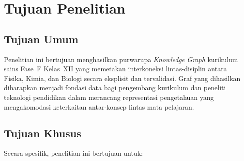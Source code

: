 \documentclass[main]{subfiles}
\begin{document}
\section{Tujuan Penelitian}

\subsection{Tujuan Umum}

Penelitian ini bertujuan menghasilkan purwarupa \textit{Knowledge Graph}
kurikulum sains Fase~F Kelas~XII yang memetakan interkoneksi lintas-disiplin
antara Fisika, Kimia, dan Biologi secara eksplisit dan tervalidasi. Graf yang
dihasilkan diharapkan menjadi fondasi data bagi pengembang kurikulum dan peneliti
teknologi pendidikan dalam merancang representasi pengetahuan yang mengakomodasi
keterkaitan antar-konsep lintas mata pelajaran.

\subsection{Tujuan Khusus}

Secara spesifik, penelitian ini bertujuan untuk:
\end{document}

